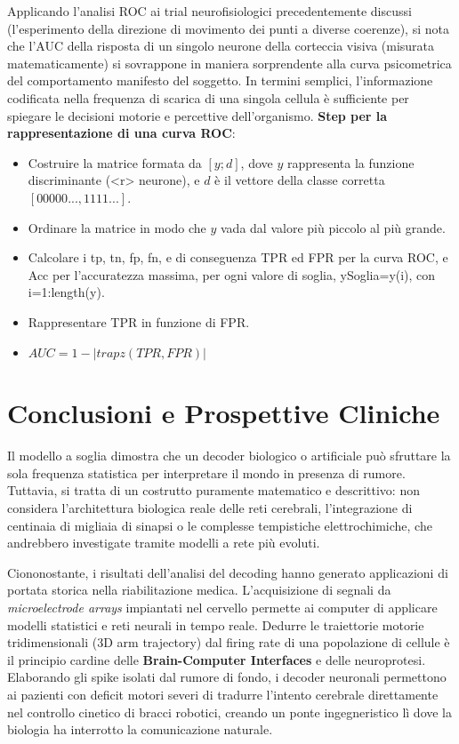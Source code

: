 Applicando l'analisi ROC ai trial neurofisiologici precedentemente discussi (l'esperimento della direzione di movimento dei punti a diverse coerenze), si nota che l'AUC della risposta di un singolo neurone della corteccia visiva (misurata matematicamente) si sovrappone in maniera sorprendente alla curva psicometrica del comportamento manifesto del soggetto. In termini semplici, l'informazione codificata nella frequenza di scarica di una singola cellula è sufficiente per spiegare le decisioni motorie e percettive dell'organismo. 
\newpage
\textbf{Step per la rappresentazione di una curva ROC}:
\begin{itemize}
    \item Costruire la matrice formata da $[y;d]$, dove $y$ rappresenta la funzione discriminante (<r> neurone), e $d$ è il vettore della classe corretta $[00000...,1111...]$.
    \item Ordinare la matrice in modo che $y$ vada dal valore più piccolo al più grande.
    \item Calcolare i tp, tn, fp, fn, e di conseguenza TPR ed FPR
    per la curva ROC, e Acc per l'accuratezza massima,
    per ogni valore di soglia, ySoglia=y(i), con
    i=1:length(y).
    \item Rappresentare TPR in funzione di FPR.
    \item $AUC  =1- |trapz(TPR,FPR)|$
\end{itemize}
\section{Conclusioni e Prospettive Cliniche}

Il modello a soglia dimostra che un decoder biologico o artificiale può sfruttare la sola frequenza statistica per interpretare il mondo in presenza di rumore. Tuttavia, si tratta di un costrutto puramente matematico e descrittivo: non considera l'architettura biologica reale delle reti cerebrali, l'integrazione di centinaia di migliaia di sinapsi o le complesse tempistiche elettrochimiche, che andrebbero investigate tramite modelli a rete più evoluti.

Ciononostante, i risultati dell'analisi del decoding hanno generato applicazioni di portata storica nella riabilitazione medica. L'acquisizione di segnali da \textit{microelectrode arrays} impiantati nel cervello permette ai computer di applicare modelli statistici e reti neurali in tempo reale. Dedurre le traiettorie motorie tridimensionali (3D arm trajectory) dal firing rate di una popolazione di cellule è il principio cardine delle \textbf{Brain-Computer Interfaces} e delle neuroprotesi. Elaborando gli spike isolati dal rumore di fondo, i decoder neuronali permettono ai pazienti con deficit motori severi di tradurre l'intento cerebrale direttamente nel controllo cinetico di bracci robotici, creando un ponte ingegneristico lì dove la biologia ha interrotto la comunicazione naturale.
